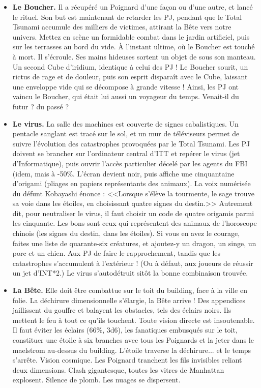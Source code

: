 \documentclass[11pt,twoside,a4paper]{book}
\begin{document}
\setlength\parindent{20pt}
\begin{itemize}
	\item \textbf{Le Boucher. }Il a r{\'e}cup{\'e}r{\'e} un Poignard d'une fa\c{c}on ou d'une autre, et lanc{\'e} le rituel. Son but est maintenant de retarder les PJ, pendant que le Total Tsunami accumule des milliers de victimes, attirant la B{\^e}te vers notre univers. Mettez en sc{\`e}ne un formidable combat dans le jardin artificiel, puis sur les terrasses au bord du vide. {\`A} l'instant ultime, o{\`u} le Boucher est touch{\'e} {\`a} mort. Il s'{\'e}croule. Ses mains hideuses sortent un objet de sous son manteau. Un second Cube d'iridium, identique {\`a} celui des PJ ! Le Boucher sourit, un rictus de rage et de douleur, puis son esprit dispara{\^i}t avec le Cube, laissant une enveloppe vide qui se d{\'e}compose {\`a} grande vitesse ! Ainsi, les PJ ont vaincu le Boucher, qui {\'e}tait lui aussi un voyageur du temps. Venait-il du futur ? du pass{\'e} ?
	\item \textbf{Le virus. }La salle des machines est couverte de signes cabalistiques. Un pentacle sanglant est trac{\'e} sur le sol, et un mur de t{\'e}l{\'e}viseurs permet de suivre l'{\'e}volution des catastrophes provoqu{\'e}es par le Total Tsunami. Les PJ doivent se brancher sur l'ordinateur central d'ITT et rep{\'e}rer le virus (jet d'Informatique), puis ouvrir l'acc{\`e}s particulier d{\'e}cel{\'e} par les agents du FBI (idem, mais {\`a} -50\%. L'{\'e}cran devient noir, puis affiche une cinquantaine d'origami (pliages en papiers repr{\'e}sentants des animaux). La voix num{\'e}ris{\'e}e du d{\'e}funt Kobayashi {\'e}nonce : <<Lorsque s'{\'e}l{\`e}ve la tourmente, le sage trouve sa voie dans les {\'e}toiles, en choisissant quatre signes du destin.>> Autrement dit, pour neutraliser le virus, il faut choisir un code de quatre origamis parmi les cinquante. Les bons sont ceux qui repr{\'e}sentent des animaux de l'horoscope chinois (les signes du destin, dans les {\'e}toiles). Si vous en avez le courage, faites une liste de quarante-six cr{\'e}atures, et ajoutez-y un dragon, un singe, un porc et un chien. Aux PJ de faire le rapprochement, tandis que les catastrophes s'accumulent {\`a} l'ext{\'e}rieur ! (Ou {\`a} d{\'e}faut, aux joueurs de r{\'e}ussir un jet d'INT*2.) Le virus s'autod{\'e}truit sit{\^o}t la bonne combinaison trouv{\'e}e.
	\item \textbf{La B{\^e}te. }Elle doit {\^e}tre combattue sur le toit du building, face {\`a} la ville en folie. La d{\'e}chirure dimensionnelle s'{\'e}largie, la B{\^e}te arrive ! Des appendices jaillissent du gouffre et balayent les obstacles, tels des {\'e}clairs noirs. Ils mettent le feu {\`a} tout ce qu'ils touchent. Toute vision directe est insoutenable. Il faut {\'e}viter les {\'e}clairs (66\%, 3d6), les fanatiques embusqu{\'e}s sur le toit, constituer une {\'e}toile {\`a} six branches avec tous les Poignards et la jeter dans le maelstrom au-dessus du building. L'{\'e}toile traverse la d{\'e}chirure... et le temps s'arr{\^e}te. Vision cosmique. Les Poignard tranchent les fils invisibles reliant deux dimensions. Clash gigantesque, toutes les vitres de Manhattan explosent. Silence de plomb. Les nuages se dispersent.
\end{itemize}~\\
\end{document}
